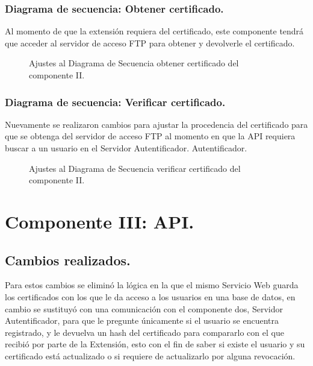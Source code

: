 \documentclass[12pt, a4paper, titlepage]{report}
\begin{document}
                \subsubsection{Diagrama de secuencia: Obtener certificado.}
                Al momento de que la extensión requiera del certificado, este componente tendrá que acceder al servidor de acceso FTP para obtener y devolverle el certificado.
	                \begin{figure}[H]
                        \centering                        
                        \caption{Ajustes al Diagrama de Secuencia obtener certificado del componente II.}
                        \label{fig:CII_SD_UC3_PII}
                    \end{figure}
                    
                \subsubsection{Diagrama de secuencia: Verificar certificado.}
                Nuevamente se realizaron cambios para ajustar la procedencia del certificado para que se obtenga del servidor de acceso FTP al momento en que la API requiera buscar a un usuario en el Servidor Autentificador. Autentificador.
	                \begin{figure}[H]
                        \centering                        
                        \caption{Ajustes al Diagrama de Secuencia verificar certificado del componente II.}
                        \label{fig:CII_SD_UC4_PII}
                    \end{figure}
                    
                    
	    \section{Componente III: API.}
	        \subsection{Cambios realizados.}
	        Para estos cambios se eliminó la lógica en la que el mismo Servicio Web guarda los certificados con los que le da acceso a los usuarios en una base de datos, en cambio se sustituyó con una comunicación con el componente dos, Servidor Autentificador, para que le pregunte únicamente si el usuario se encuentra registrado, y le devuelva un hash del certificado para compararlo con el que recibió por parte de la Extensión, esto con el fin de saber si existe el usuario y su certificado está actualizado o si requiere de actualizarlo por alguna revocación.
	        
\end{document}
